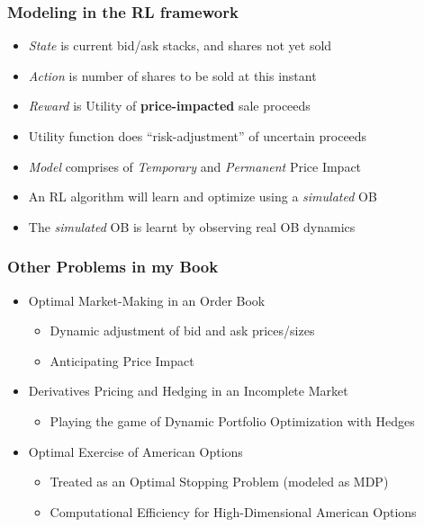 \documentclass{beamer}
\begin{document}
\begin{frame}
\frametitle{Modeling in the RL framework}
\pause
\begin{itemize}[<+->]
\item {\em State} is current bid/ask stacks, and shares not yet sold
\item {\em Action} is number of shares to be sold at this instant
\item {\em Reward} is Utility of {\bf price-impacted} sale proceeds
\item Utility function does ``risk-adjustment'' of uncertain proceeds
\item {\em Model} comprises of {\em Temporary} and {\em Permanent} Price Impact
\item An RL algorithm will learn and optimize using a {\em simulated} OB
\item The {\em simulated} OB is learnt by observing real OB dynamics
\end{itemize}
\end{frame}

\begin{frame}
\frametitle{Other Problems in my Book}
\pause
\begin{itemize}[<+->]
\item Optimal Market-Making in an Order Book
\begin{itemize}
\item Dynamic adjustment of bid and ask prices/sizes
\item Anticipating Price Impact 
\end{itemize}
\item Derivatives Pricing and Hedging in an Incomplete Market
\begin{itemize}
\item Playing the game of Dynamic Portfolio Optimization with Hedges
\end{itemize}
\item Optimal Exercise of American Options
\begin{itemize}
\item Treated as an Optimal Stopping Problem (modeled as MDP)
\item Computational Efficiency for High-Dimensional American Options
\end{itemize}
\end{itemize}
\end{frame}
\end{document}
